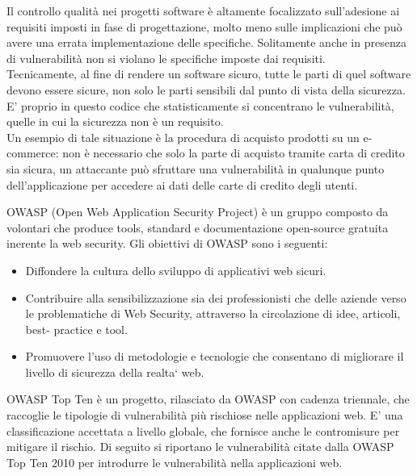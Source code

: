Il controllo qualità nei progetti software è altamente focalizzato sull'adesione ai requisiti imposti in fase di progettazione, molto meno sulle implicazioni che può avere una errata implementazione delle specifiche. Solitamente anche in presenza di vulnerabilità non si violano le specifiche imposte dai requisiti.\\
Tecnicamente, al fine di rendere un software sicuro, tutte le parti di quel software devono essere sicure, non solo le parti sensibili dal punto di vista della sicurezza. E' proprio in questo codice che statisticamente si concentrano le vulnerabilità, quelle in cui la sicurezza non è un requisito. \\
Un esempio di tale situazione è la procedura di acquisto prodotti su un e-commerce: non è necessario che solo la parte di acquisto tramite carta di credito sia sicura, un attaccante può sfruttare una vulnerabilità in qualunque punto dell'applicazione per accedere ai dati delle carte di credito degli utenti.

OWASP (Open Web Application Security Project) è un gruppo composto da volontari che produce tools, standard e documentazione open-source gratuita inerente la web security. 
Gli obiettivi di OWASP sono i seguenti:
\begin{itemize}
\item Diffondere la cultura dello sviluppo di applicativi web sicuri.
\item Contribuire alla sensibilizzazione sia dei professionisti che delle aziende verso le problematiche di Web Security, attraverso la circolazione di idee, articoli, best- practice e tool.
\item Promuovere l’uso di metodologie e tecnologie che consentano di migliorare il livello di sicurezza della realta` web.
\end{itemize}
OWASP Top Ten è un progetto, rilasciato da OWASP con cadenza triennale, che raccoglie le tipologie di vulnerabilità più rischiose nelle applicazioni web. E' una classificazione accettata a livello globale, che fornisce anche le contromisure per mitigare il rischio. Di seguito si riportano le vulnerabilità citate dalla OWASP Top Ten 2010 per introdurre le vulnerabilità nella applicazioni web.

